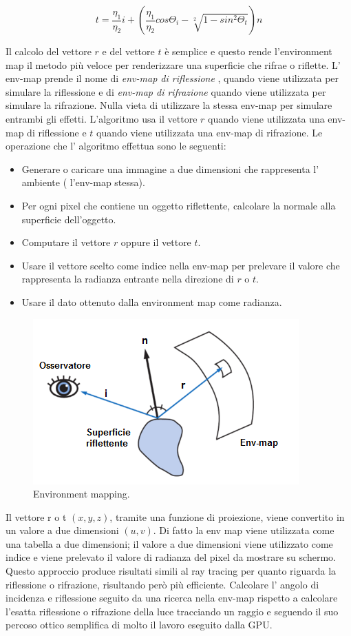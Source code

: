 \begin{equation}
t = \frac{\eta_1}{\eta_2}i + (\frac{\eta_1}{\eta_2}cos\Theta_i - \sqrt[2]{1 - sin^2\Theta_t})n
\end{equation}

Il calcolo del vettore $r$ e del vettore $t$ è semplice e questo rende l’environment map il metodo più veloce per renderizzare una superficie che rifrae o riflette.
L’ env-map prende il nome di \emph{env-map di riflessione} , quando viene utilizzata per simulare la riflessione e di \emph{env-map di rifrazione} quando viene utilizzata per simulare la rifrazione. Nulla vieta di utilizzare la stessa env-map per simulare entrambi gli effetti.
L’algoritmo usa il vettore $r$ quando viene utilizzata una env-map di riflessione e $t$ quando viene utilizzata una env-map di rifrazione.
Le operazione che l’ algoritmo effettua sono le seguenti:
\begin{itemize}
\item Generare o caricare una immagine a due dimensioni che rappresenta l’ ambiente ( l’env-map stessa).
\item Per ogni pixel che contiene un oggetto riflettente, calcolare la normale alla superficie dell’oggetto.
\item Computare il vettore $r$ oppure il vettore $t$.
\item Usare il vettore scelto come indice nella env-map per prelevare il valore che rappresenta la radianza entrante nella direzione di $r$ o $t$.
\item Usare il dato ottenuto dalla environment map come radianza. 
\end{itemize}
\begin{figure}[htb]
\centering
\includegraphics[width=0.5\linewidth]{images/chapter_stato_arte/stato_arte_env_alg.png}\hfill
\caption[Algoritmo environment mapping]{Environment mapping.}
\label{fig:stato_arte_env_alg}
\end{figure}

Il vettore r o t $(x,y,z)$, tramite una funzione di proiezione, viene convertito in un valore a due dimensioni $(u,v)$. Di fatto la env map viene utilizzata come una tabella a due dimensioni; il valore a due dimensioni viene utilizzato come indice e viene prelevato il valore di radianza del pixel da mostrare su schermo. 
Questo approccio produce risultati simili al ray tracing per quanto riguarda la riflessione o rifrazione, risultando però  più efficiente. 
Calcolare l’ angolo di incidenza e riflessione seguito da una ricerca nella env-map rispetto a calcolare l’esatta riflessione o rifrazione della luce tracciando un raggio e seguendo il suo percoso ottico semplifica di molto il lavoro eseguito dalla GPU. 

